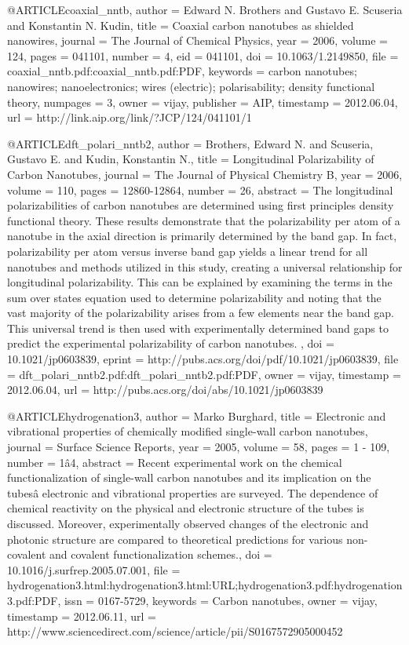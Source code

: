 @ARTICLE{coaxial_nntb,
  author = {Edward N. Brothers and Gustavo E. Scuseria and Konstantin N. Kudin},
  title = {Coaxial carbon nanotubes as shielded nanowires},
  journal = {The Journal of Chemical Physics},
  year = {2006},
  volume = {124},
  pages = {041101},
  number = {4},
  eid = {041101},
  doi = {10.1063/1.2149850},
  file = {coaxial_nntb.pdf:coaxial_nntb.pdf:PDF},
  keywords = {carbon nanotubes; nanowires; nanoelectronics; wires (electric); polarisability;
	density functional theory},
  numpages = {3},
  owner = {vijay},
  publisher = {AIP},
  timestamp = {2012.06.04},
  url = {http://link.aip.org/link/?JCP/124/041101/1}
}

@ARTICLE{dft_polari_nntb2,
  author = {Brothers, Edward N. and Scuseria, Gustavo E. and Kudin, Konstantin
	N.},
  title = {Longitudinal Polarizability of Carbon Nanotubes},
  journal = {The Journal of Physical Chemistry B},
  year = {2006},
  volume = {110},
  pages = {12860-12864},
  number = {26},
  abstract = { The longitudinal polarizabilities of carbon nanotubes are determined
	using first principles density functional theory. These results demonstrate
	that the polarizability per atom of a nanotube in the axial direction
	is primarily determined by the band gap. In fact, polarizability
	per atom versus inverse band gap yields a linear trend for all nanotubes
	and methods utilized in this study, creating a universal relationship
	for longitudinal polarizability. This can be explained by examining
	the terms in the sum over states equation used to determine polarizability
	and noting that the vast majority of the polarizability arises from
	a few elements near the band gap. This universal trend is then used
	with experimentally determined band gaps to predict the experimental
	polarizability of carbon nanotubes. },
  doi = {10.1021/jp0603839},
  eprint = {http://pubs.acs.org/doi/pdf/10.1021/jp0603839},
  file = {dft_polari_nntb2.pdf:dft_polari_nntb2.pdf:PDF},
  owner = {vijay},
  timestamp = {2012.06.04},
  url = {http://pubs.acs.org/doi/abs/10.1021/jp0603839}
}

@ARTICLE{hydrogenation3,
  author = {Marko Burghard},
  title = {Electronic and vibrational properties of chemically modified single-wall
	carbon nanotubes},
  journal = {Surface Science Reports},
  year = {2005},
  volume = {58},
  pages = {1 - 109},
  number = {1â4},
  abstract = {Recent experimental work on the chemical functionalization of single-wall
	carbon nanotubes and its implication on the tubesâ electronic and
	vibrational properties are surveyed. The dependence of chemical reactivity
	on the physical and electronic structure of the tubes is discussed.
	Moreover, experimentally observed changes of the electronic and photonic
	structure are compared to theoretical predictions for various non-covalent
	and covalent functionalization schemes.},
  doi = {10.1016/j.surfrep.2005.07.001},
  file = {hydrogenation3.html:hydrogenation3.html:URL;hydrogenation3.pdf:hydrogenation3.pdf:PDF},
  issn = {0167-5729},
  keywords = {Carbon nanotubes},
  owner = {vijay},
  timestamp = {2012.06.11},
  url = {http://www.sciencedirect.com/science/article/pii/S0167572905000452}
}

